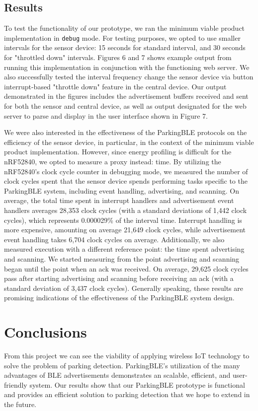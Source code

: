 \documentclass[sigconf]{acmart}
\begin{document}
\subsection{Results}
To test the functionality of our prototype, we ran the minimum viable
product implementation in \verb.debug. mode. For testing purposes, we
opted to use smaller intervals for the sensor device: 15 seconds for
standard interval, and 30 seconds for "throttled down" intervals. Figures
6 and 7 shows example output from running this implementation in conjunction
with the functioning web server. We also successfully tested the
interval frequency change the sensor device via button interrupt-based
"throttle down" feature in the central device. Our output demonstrated
in the figures includes the advertisement buffers received and sent for
both the sensor and central device, as well as output designated for
the web server to parse and display in the user interface shown in
Figure 7. \newline

We were also interested in the effectiveness of the ParkingBLE protocols
on the efficiency of the sensor device, in particular, in the context
of the minimum viable product implementation. However, since
energy profiling is difficult for the nRF52840, we opted to measure a
proxy instead: time. By utilizing the nRF52840's clock cycle counter in
debugging mode, we measured the number of clock cycles spent that the
sensor device spends performing tasks specific to the ParkingBLE system,
including event handling, advertising, and scanning. On average, the total
time spent in interrupt handlers and advertisement event handlers averages
28,353 clock cycles (with a standard deviations of 1,442 clock cycles), which
represents 0.000029\% of the interval time. Interrupt handling is more
expensive, amounting on average 21,649 clock cycles, while advertisement
event handling takes 6,704 clock cycles on average. Additionally, we also
measured execution with a different reference point: the time spent
advertising and scanning. We started measuring from the point advertising
and scanning began until the point when an ack was received. On average,
29,625 clock cycles pass after starting advertising and scanning before
receiving an ack (with a standard deviation of 3,437 clock cycles).
Generally speaking, these results are promising indications of the
effectiveness of the ParkingBLE system design.

\section{Conclusions}
From this project we can see the viability of applying wireless IoT technology to
solve the problem of parking detection. ParkingBLE's utilization of the many
advantages of BLE advertisements demonstrates an scalable, efficient, and user-
friendly system. Our results show that our ParkingBLE prototype is functional and
provides an efficient solution to parking detection that we hope to extend
in the future.
\end{document}
